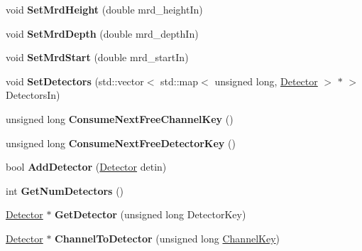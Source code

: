 \begin{DoxyCompactItemize}
\item 
\hypertarget{classGeometry_a42377661ec147b299c500e9aa49aaf54}{void {\bfseries Set\-Mrd\-Height} (double mrd\-\_\-height\-In)}\label{classGeometry_a42377661ec147b299c500e9aa49aaf54}

\item 
\hypertarget{classGeometry_a44da646292c6c7e83709e8aa47236844}{void {\bfseries Set\-Mrd\-Depth} (double mrd\-\_\-depth\-In)}\label{classGeometry_a44da646292c6c7e83709e8aa47236844}

\item 
\hypertarget{classGeometry_a100d585e24c6c52794741e280d4dd4c6}{void {\bfseries Set\-Mrd\-Start} (double mrd\-\_\-start\-In)}\label{classGeometry_a100d585e24c6c52794741e280d4dd4c6}

\item 
\hypertarget{classGeometry_a2543a2a6d20336cc25a26fba69245955}{void {\bfseries Set\-Detectors} (std\-::vector$<$ std\-::map$<$ unsigned long, \hyperlink{classDetector}{Detector} $>$ $\ast$ $>$Detectors\-In)}\label{classGeometry_a2543a2a6d20336cc25a26fba69245955}

\item 
\hypertarget{classGeometry_ac5f3c966b7862b10af20fb83c9c45082}{unsigned long {\bfseries Consume\-Next\-Free\-Channel\-Key} ()}\label{classGeometry_ac5f3c966b7862b10af20fb83c9c45082}

\item 
\hypertarget{classGeometry_aea3868f7e8a725f672a2e488fe95eb5f}{unsigned long {\bfseries Consume\-Next\-Free\-Detector\-Key} ()}\label{classGeometry_aea3868f7e8a725f672a2e488fe95eb5f}

\item 
\hypertarget{classGeometry_aedc8d0b00db707eb63177b3fbc55e7f7}{bool {\bfseries Add\-Detector} (\hyperlink{classDetector}{Detector} detin)}\label{classGeometry_aedc8d0b00db707eb63177b3fbc55e7f7}

\item 
\hypertarget{classGeometry_a9c164587d17b71fb8cbcfa0535dca18f}{int {\bfseries Get\-Num\-Detectors} ()}\label{classGeometry_a9c164587d17b71fb8cbcfa0535dca18f}

\item 
\hypertarget{classGeometry_a3b4131297b0329603c7700e7eed9cf0b}{\hyperlink{classDetector}{Detector} $\ast$ {\bfseries Get\-Detector} (unsigned long Detector\-Key)}\label{classGeometry_a3b4131297b0329603c7700e7eed9cf0b}

\item 
\hypertarget{classGeometry_a6091d6b92a17207fdda50a03cc64b381}{\hyperlink{classDetector}{Detector} $\ast$ {\bfseries Channel\-To\-Detector} (unsigned long \hyperlink{classChannelKey}{Channel\-Key})}\label{classGeometry_a6091d6b92a17207fdda50a03cc64b381}


\end{DoxyCompactItemize}
